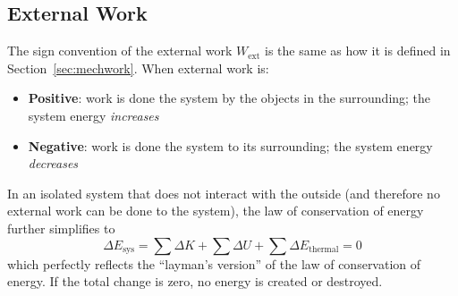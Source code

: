 \subsection{External Work}
\label{sec:ext-work}

The sign convention of the external work $W_\text{ext}$ is the same as how it
is defined in Section~\ref{sec:mechwork}. When external work is: 
\begin{itemize}[itemsep=6pt]
\item\textbf{Positive}: work is done  the system by the objects in
  the surrounding; the system energy \emph{increases}
\item\textbf{Negative}: work is done  the system to its surrounding;
  the system energy \emph{decreases}
\end{itemize}
In an isolated system that does not interact with the outside (and therefore no
external work can be done to the system), the law of conservation of energy
further simplifies to
\begin{equation}
  \Delta E_\text{sys}=\sum\Delta K+\sum\Delta U+\sum\Delta E_\text{thermal}=0
\end{equation}
which perfectly reflects the ``layman's version'' of the law of conservation of
energy. If the total change is zero, no energy is created or destroyed.

%  
%



